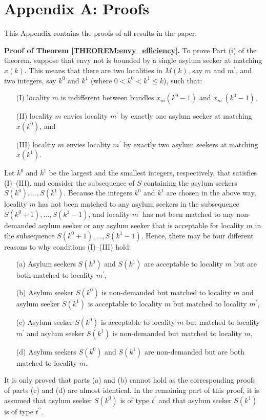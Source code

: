 \documentclass[12pt,fleqn]{article}
\begin{document}
\section*{Appendix A: Proofs}
This Appendix contains the proofs of all results in the paper.

\medskip

\noindent\textbf{Proof of Theorem \ref{THEOREM:envy_efficiency}.} To prove Part (i) of the theorem, suppose that envy not is bounded by a single asylum seeker at matching $x(k)$. This means that there are two localities in $M(k)$, say $m$ and $m^\prime$, and two integers, say $k^0$ and $k^1$ (where $0<k^0<k^1\leq k$), such that:
\begin{itemize}
\item[(I)] locality $m$ is indifferent between bundles $x_{m}(k^0-1)$ and $x_{m^\prime}(k^0-1)$,
\item[(II)] locality $m$ envies locality $m^\prime$ by exactly one asylum seeker at matching $x(k^0)$, and
\item[(III)] locality $m$ envies locality $m^\prime$ by exactly two asylum seekers at matching $x(k^1)$.
\end{itemize}
\noindent Let $k^0$ and $k^1$ be the largest and the smallest integers, respectively, that satisfies (I)--(III), and consider the subsequence of $S$ containing the asylum seekers $S(k^0),\ldots,S(k^1)$. Because the integers $k^0$ and $k^1$ are chosen in the above way, locality $m$ has not been matched to any asylum seekers in the subsequence $S(k^0+1),\ldots,S(k^1-1)$, and locality $m^\prime$ has not been matched to any non-demanded asylum seeker or any asylum seeker that is acceptable for locality $m$ in the subsequence $S(k^0+1),\ldots,S(k^1-1)$. Hence, there may be four different reasons to why conditions (I)--(III) hold:
\begin{itemize}
\item[(a)] Asylum seekers $S(k^0)$ and $S(k^1)$ are acceptable to locality $m$ but are both matched to locality $m^\prime$,
\item[(b)] Asylum seeker $S(k^0)$ is non-demanded but matched to locality $m$ and asylum seeker $S(k^1)$ is acceptable to locality $m$ but matched to locality $m^\prime$,
\item[(c)] Asylum seeker $S(k^0)$ is acceptable to locality $m$ but matched to locality $m^\prime$ and asylum seeker $S(k^1)$ is non-demanded but matched to locality $m$,
\item[(d)] Asylum seekers $S(k^0)$ and $S(k^1)$ are non-demanded but are both matched to locality $m$.
\end{itemize}
\noindent It is only proved that parts (a) and (b) cannot hold as the corresponding proofs of parts (c) and (d) are almost identical. In the remaining part of this proof, it is assumed that asylum seeker $S(k^0)$ is of type $t^\prime$ and that asylum seeker $S(k^1)$ is of type $t^{\prime\prime}$.
\end{document}
